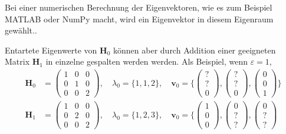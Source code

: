 
Bei einer numerischen Berechnung der Eigenvektoren, wie es zum Beispiel MATLAB oder NumPy macht, wird ein Eigenvektor in diesem Eigenraum gewählt..

Entartete Eigenwerte von $\bm H_0$ können aber durch Addition einer geeigneten Matrix $\bm H_1$ in einzelne gespalten werden werden.
Als Beispiel, wenn $\varepsilon = 1$, 
\begin{align}
    \bm H_0 &= 
    \begin{pmatrix}
        1 & 0 & 0\\
        0 & 1 & 0\\
        0 & 0 & 2
    \end{pmatrix},
    \quad
    \lambda_0 = \{1, 1, 2\},
    \quad
    \bm v_0 = \{
    \begin{pmatrix}
        ?\\
        ?\\
        0
    \end{pmatrix},
    \begin{pmatrix}
        ?\\
        ?\\
        0
    \end{pmatrix},
    \begin{pmatrix}
        0\\
        0\\
        1
    \end{pmatrix}
    \}
    \\
    \bm H_1 &= 
    \begin{pmatrix}
        1 & 0 & 0\\
        0 & 2 & 0\\
        0 & 0 & 2
    \end{pmatrix},
    \quad
    \lambda_0 = \{1, 2, 3\},
    \quad
    \bm v_0 = \{
    \begin{pmatrix}
        1\\
        0\\
        0
    \end{pmatrix},
    \begin{pmatrix}
        0\\
        ?\\
        ?
    \end{pmatrix},
    \begin{pmatrix}
        0\\
        ?\\
        ?
    \end{pmatrix}

\end{align}
